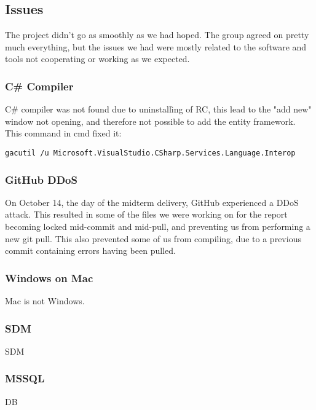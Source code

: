 \subsection{Issues}
The project didn't go as smoothly as we had hoped. The group agreed on pretty much everything, but the issues we had were mostly related to the software and tools not cooperating or working as we expected.

\subsubsection{C\# Compiler}
C\# compiler was not found due to uninstallìng of RC, this lead to the "add new" window not opening, and therefore not possible to add the entity framework.\\
This command in cmd fixed it:
\begin{verbatim}
gacutil /u Microsoft.VisualStudio.CSharp.Services.Language.Interop 
\end{verbatim}

\subsubsection{GitHub DDoS}
On October 14, the day of the midterm delivery, GitHub experienced a DDoS attack. This resulted in some of the files we were working on for the report becoming locked mid-commit and mid-pull, and preventing us from performing a new git pull. This also prevented some of us from compiling, due to a previous commit containing errors having been pulled.

\subsubsection{Windows on Mac}
Mac is not Windows. %

\subsubsection{SDM}
SDM %

\subsubsection{MSSQL}
DB


